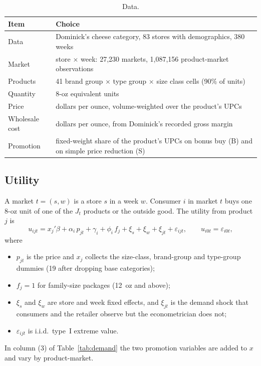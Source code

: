 \documentclass[11pt]{article}
\begin{document}
\begin{table}[h!]
\centering\small
\begin{tabularx}{\textwidth}{@{}lL@{}}
\toprule
Item & Choice \\
\midrule
Data & Dominick's cheese category, 83 stores with demographics, 380 weeks \\
Market & store $\times$ week: 27,230 markets, 1,087,156 product-market observations \\
Products & 41 brand group $\times$ type group $\times$ size class cells (90\% of units) \\
Quantity & 8-oz equivalent units \\
Price & dollars per ounce, volume-weighted over the product's UPCs \\
Wholesale cost & dollars per ounce, from Dominick's recorded gross margin \\
Promotion & fixed-weight share of the product's UPCs on bonus buy (B) and on simple price reduction (S) \\
\bottomrule
\end{tabularx}
\caption{Data.}\label{tab:setup}
\end{table}

\subsection{Utility}

A market $t = (s, w)$ is a store $s$ in a week $w$. Consumer $i$ in market $t$ buys one
8-oz unit of one of the $J_t$ products or the outside good. The utility from product $j$ is
\begin{equation}
  u_{ijt} = x_j'\beta + \alpha_i\, p_{jt} + \gamma_i + \phi_i\, f_j
            + \xi_s + \xi_w + \xi_{jt} + \varepsilon_{ijt},
  \qquad u_{i0t} = \varepsilon_{i0t},
  \label{eq:utility}
\end{equation}
where
\begin{itemize}
  \item $p_{jt}$ is the price and $x_j$ collects the size-class, brand-group and type-group
        dummies (19 after dropping base categories);
  \item $f_j = 1$ for family-size packages (12~oz and above);
  \item $\xi_s$ and $\xi_w$ are store and week fixed effects, and $\xi_{jt}$ is the demand
        shock that consumers and the retailer observe but the econometrician does not;
  \item $\varepsilon_{ijt}$ is i.i.d.\ type~I extreme value.
\end{itemize}
In column (3) of Table~\ref{tab:demand} the two promotion variables are added to $x$ and
vary by product-market.
\end{document}
